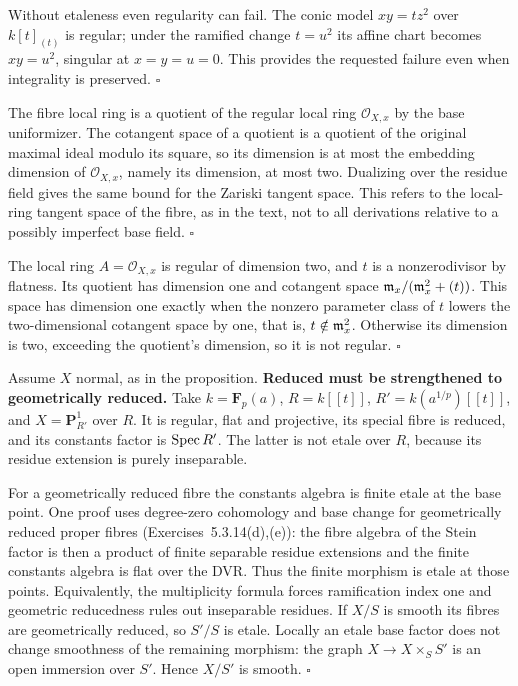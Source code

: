 \documentclass[11pt]{article}
\let\chapterexercise\exercise
\renewcommand{\exercise}[2]{\Needspace{8\baselineskip}\chapterexercise{#1}{#2}}
\begin{document}
Without etaleness even regularity can fail. The conic model $xy=t z^2$ over $k[t]_{(t)}$ is regular; under the ramified change $t=u^2$ its affine chart becomes $xy=u^2$, singular at $x=y=u=0$. This provides the requested failure even when integrality is preserved. \hfill$\square$

\pf
The fibre local ring is a quotient of the regular local ring $\mathcal O_{X,x}$ by the base uniformizer. The cotangent space of a quotient is a quotient of the original maximal ideal modulo its square, so its dimension is at most the embedding dimension of $\mathcal O_{X,x}$, namely its dimension, at most two. Dualizing over the residue field gives the same bound for the Zariski tangent space. This refers to the local-ring tangent space of the fibre, as in the text, not to all derivations relative to a possibly imperfect base field. \hfill$\square$

\pf
The local ring $A=\mathcal O_{X,x}$ is regular of dimension two, and $t$ is a nonzerodivisor by flatness. Its quotient has dimension one and cotangent space $\mathfrak m_x/(\mathfrak m_x^2+(t))$. This space has dimension one exactly when the nonzero parameter class of $t$ lowers the two-dimensional cotangent space by one, that is, $t\notin\mathfrak m_x^2$. Otherwise its dimension is two, exceeding the quotient's dimension, so it is not regular. \hfill$\square$

\pf
Assume $X$ normal, as in the proposition. \textbf{Reduced must be strengthened to geometrically reduced.} Take $k=\mathbf F_p(a)$, $R=k[[t]]$, $R'=k(a^{1/p})[[t]]$, and $X=\mathbf P^1_{R'}$ over $R$. It is regular, flat and projective, its special fibre is reduced, and its constants factor is $\operatorname{Spec} R'$. The latter is not etale over $R$, because its residue extension is purely inseparable.

For a geometrically reduced fibre the constants algebra is finite etale at the base point. One proof uses degree-zero cohomology and base change for geometrically reduced proper fibres (Exercises~5.3.14(d),(e)): the fibre algebra of the Stein factor is then a product of finite separable residue extensions and the finite constants algebra is flat over the DVR. Thus the finite morphism is etale at those points. Equivalently, the multiplicity formula forces ramification index one and geometric reducedness rules out inseparable residues. If $X/S$ is smooth its fibres are geometrically reduced, so $S'/S$ is etale. Locally an etale base factor does not change smoothness of the remaining morphism: the graph $X\to X\times_SS'$ is an open immersion over $S'$. Hence $X/S'$ is smooth. \hfill$\square$
\end{document}
